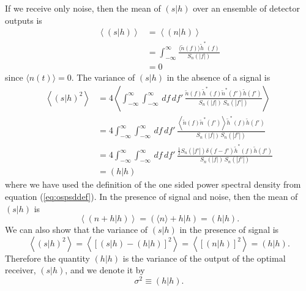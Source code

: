 If we receive only noise, then the mean of $(s|h)$ over an ensemble of detector
outputs is 
\begin{equation}
\begin{split}
\left\langle (s|h) \right\rangle &= \left\langle (n|h) \right\rangle \\
&= \int_{-\infty}^{\infty} 
   \frac{\langle\tilde{n}(f)\rangle \tilde{h}^\ast(f)}{S_n(|f|)} \\
&= 0
\end{split}
\end{equation}
since $\langle n(t) \rangle = 0$. The variance of $(s|h)$ in the absence of
a signal is
\begin{equation}
\begin{split}
\left\langle(s|h)^2\right\rangle 
&= 4 \left\langle \int_{-\infty}^\infty \int_{-\infty}^\infty \,df\,df'\,
\frac{\tilde{n}(f)\tilde{h}^\ast(f) \tilde{n}^\ast(f')\tilde{h}(f')}
{S_n(|f|)\,S_n(|f'|)} \right\rangle \\
&= 4 \int_{-\infty}^\infty \int_{-\infty}^\infty \,df\,df'\,
\frac{\left\langle \tilde{n}(f)\tilde{n}^\ast(f')\right\rangle\tilde{h}^\ast(f)\tilde{h}(f')}
{S_n(|f|)\,S_n(|f'|)} \\
&= 4 \int_{-\infty}^\infty \int_{-\infty}^\infty \,df\,df'\,
\frac{\frac{1}{2}S_n(|f'|)\delta(f-f') \tilde{h}^\ast(f)\tilde{h}(f')}
{S_n(|f|)\,S_n(|f'|)} \\
&= (h|h)
\end{split}
\label{eq:filtervariance}
\end{equation}
where we have used the definition of the one sided power spectral density from
equation (\ref{eq:ospsddef}).  In the presence of signal and noise, then the
mean of $(s|h)$ is
\begin{equation}
\left\langle (n+h|h) \right\rangle = (\langle n \rangle + h|h) = (h|h).
\end{equation}
We can also show that the variance of $(s|h)$ in the presence of signal is
\begin{equation}
\left\langle (s|h)^2 \right\rangle 
= \left\langle \left[ (s|h) - (h|h) \right]^2 \right\rangle
= \left\langle \left[ (n|h) \right]^2 \right\rangle
= (h|h).
\end{equation}
Therefore the quantity $(h|h)$ is the variance of the output of the optimal
receiver, $(s|h)$, and we denote it by
\begin{equation}
\sigma^2 \equiv (h|h).
\label{eq:sigmasqdef}
\end{equation}


